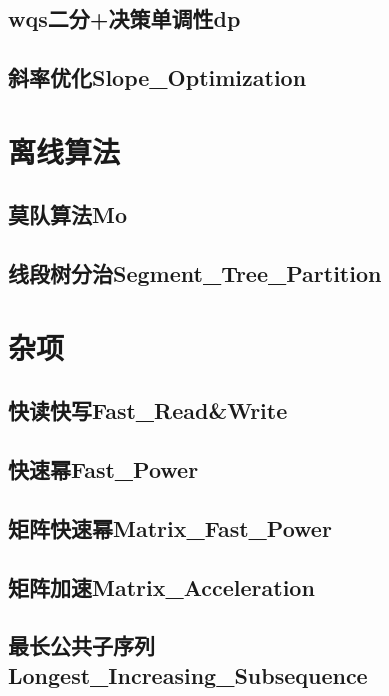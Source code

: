 \documentclass[10pt,a4paper]{article}
\begin{document}
\subsection{wqs二分+决策单调性dp}

\subsection{斜率优化Slope\_Optimization}


\newpage
\section{离线算法}
\subsection{莫队算法Mo}

\subsection{线段树分治Segment\_Tree\_Partition}


\newpage
\section{杂项}
\subsection{快读快写Fast\_Read\&Write}

\subsection{快速幂Fast\_Power}

\subsection{矩阵快速幂Matrix\_Fast\_Power}

\subsection{矩阵加速Matrix\_Acceleration}

\subsection{最长公共子序列Longest\_Increasing\_Subsequence}

\end{document}
